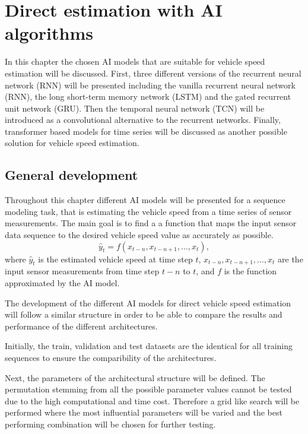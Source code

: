 \chapter{Direct estimation with AI algorithms}
\label{ch:direct_estimation}

In this chapter the chosen AI models that are suitable for vehicle speed estimation will be discussed. First, three different versions of the recurrent neural network (RNN) will be presented including the vanilla recurrent neural network (RNN), the long short-term memory network (LSTM) and the gated recurrent unit network (GRU). Then the temporal neural network (TCN) will be introduced as a convolutional alternative to the recurrent networks. Finally, transformer based models for time series will be discussed as another possible solution for vehicle speed estimation.

\section{General development}

Throughout this chapter different AI models will be presented for a sequence modeling task, that is estimating the vehicle speed from a time series of sensor measurements. The main goal is to find a a function that maps the input sensor data sequence to the desired vehicle speed value as accurately as possible. 
\begin{equation}
    \hat{y}_t = f(x_{t-n}, x_{t-n+1}, ..., x_{t}),
\end{equation}
where $\hat{y}_t$ is the estimated vehicle speed at time step $t$, $x_{t-n}, x_{t-n+1}, ..., x_{t}$ are the input sensor measurements from time step $t-n$ to $t$, and $f$ is the function approximated by the AI model.

The development of the different AI models for direct vehicle speed estimation will follow a similar structure in order to be able to compare the results and performance of the different architectures.

Initially, the train, validation and test datasets are the identical for all training sequences to ensure the comparibility of the architectures.

Next, the parameters of the architectural structure will be defined. The permutation stemming from all the possible parameter values cannot be tested due to the high computational and time cost. Therefore a grid like search will be performed where the most influential parameters will be varied and the best performing combination will be chosen for further testing.

